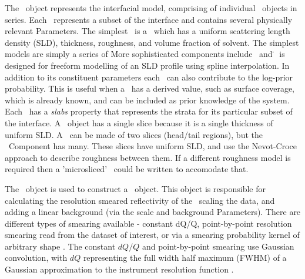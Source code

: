 \documentclass[12pt]{article}
\begin{document}
The \Structure\ object represents the interfacial model, comprising of individual \Component\ objects in series. Each \Component\ represents a subset of the interface and contains several physically relevant Parameters. The simplest \Component\ is a \Slab\, which has a uniform scattering length density (SLD), thickness, roughness, and volume fraction of solvent. The simplest models are simply a series of \Slab\. More sophisticated components include \LipidLeaflet\ and \Spline\. \Spline\ is designed for freeform modelling of an SLD profile using spline interpolation. In addition to its constituent parameters each \Component\ can also contribute to the log-prior probability. This is useful when a \Component\ has a derived value, such as surface coverage, which is already known, and can be included as prior knowledge of the system. Each \Component\ has a \emph{slabs} property that represents the strata for its particular subset of the interface. A \Slab\ object has a single slice because it is a single thickness of uniform SLD. A \LipidLeaflet\ can be made of two slices (head/tail regions), but the \Spline\ Component has many. These slices have uniform SLD, and use the Nevot-Croce approach \cite{Nevot1980} to describe roughness between them. If a different roughness model is required then a 'microsliced' \Component\ could be written to accomodate that.

The \Structure\ object is used to construct a \ReflectModel\ object. This object is responsible for calculating the resolution smeared reflectivity of the \Structure\, scaling the data, and adding a linear background (via the scale and background Parameters). There are different types of smearing available - constant dQ/Q, point-by-point resolution smearing read from the dataset of interest, or via a smearing probability kernel of arbitrary shape \cite{Nelson2014}. The constant $dQ/Q$ and point-by-point smearing use Gaussian convolution, with $dQ$ representing the full width half maximum (FWHM) of a Gaussian approximation to the instrument resolution function \cite{Well2005}.
\end{document}
